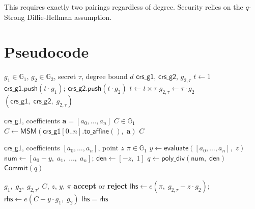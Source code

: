 This requires exactly two pairings regardless of degree. Security
relies on the $q$-Strong Diffie-Hellman assumption.

\section{Pseudocode}

\begin{algorithm}[H]
\caption{KZG Setup}
\label{alg:kzg-setup}
\begin{algorithmic}[1]
\Require $g_1 \in \mathbb{G}_1$, $g_2 \in \mathbb{G}_2$,
         secret $\tau$, degree bound $d$
\Ensure  $\mathsf{crs\_g1}$, $\mathsf{crs\_g2}$, $g_{2,\tau}$
\State $t \gets 1$
    \State $\mathsf{crs\_g1}.\mathsf{push}(t \cdot g_1)$;\;
           $\mathsf{crs\_g2}.\mathsf{push}(t \cdot g_2)$
    \State $t \gets t \times \tau$
\EndFor
\State $g_{2,\tau} \gets \tau \cdot g_2$
\State \Return $(\mathsf{crs\_g1},\; \mathsf{crs\_g2},\; g_{2,\tau})$
\end{algorithmic}
\end{algorithm}

\begin{algorithm}[H]
\caption{KZG Commit}
\label{alg:kzg-commit}
\begin{algorithmic}[1]
\Require $\mathsf{crs\_g1}$, coefficients $\mathbf{a} = [a_0, \ldots, a_n]$
\Ensure  $C \in \mathbb{G}_1$
\State $C \gets \mathsf{MSM}(\mathsf{crs\_g1}[0..n].\mathsf{to\_affine}(),\; \mathbf{a})$
\State \Return $C$
\end{algorithmic}
\end{algorithm}

\begin{algorithm}[H]
\caption{KZG Open (Prove)}
\label{alg:kzg-open}
\begin{algorithmic}[1]
\Require $\mathsf{crs\_g1}$, coefficients $[a_0, \ldots, a_n]$, point $z$
\Ensure  $\pi \in \mathbb{G}_1$
\State $y \gets \mathsf{evaluate}([a_0, \ldots, a_n],\; z)$
\State $\mathsf{num} \gets [a_0 - y,\; a_1,\; \ldots,\; a_n]$;\;
       $\mathsf{den} \gets [-z,\; 1]$
\State $q \gets \mathsf{poly\_div}(\mathsf{num},\; \mathsf{den})$
\State \Return $\mathsf{Commit}(q)$
\end{algorithmic}
\end{algorithm}

\begin{algorithm}[H]
\caption{KZG Verify}
\label{alg:kzg-verify}
\begin{algorithmic}[1]
\Require $g_1,\; g_2,\; g_{2,\tau}$, $C$, $z$, $y$, $\pi$
\Ensure  \textbf{accept} or \textbf{reject}
\State $\mathsf{lhs} \gets e(\pi,\; g_{2,\tau} - z \cdot g_2)$;\;
       $\mathsf{rhs} \gets e(C - y \cdot g_1,\; g_2)$
\State \Return $\mathsf{lhs} = \mathsf{rhs}$
\end{algorithmic}
\end{algorithm}

